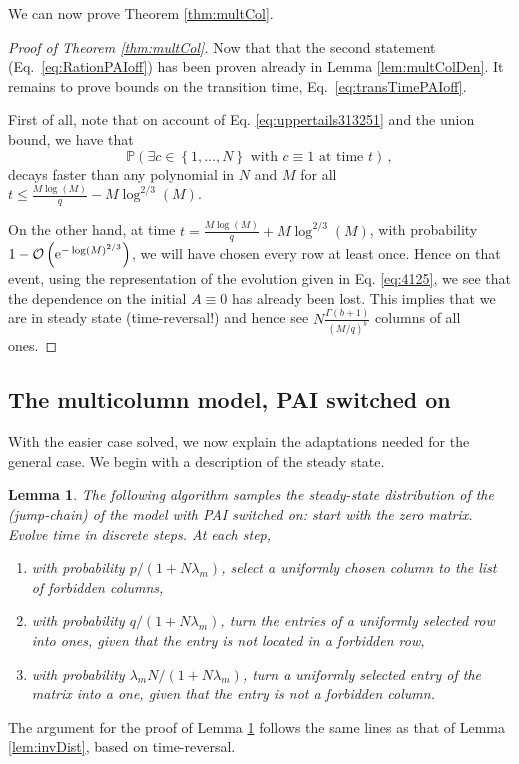 \documentclass{article}
\numberwithin{equation}{section}
\newcommand{\gk}[1]{\left\{#1\right\}}
\newcommand{\rk}[1]{\left(#1\right)}
\newcommand{\Ocal}   {{\mathcal O }}
\renewcommand{\P}   {\mathbb{P}}
\newcommand{\ex}{{\rm e}}
\renewcommand{\l}{\lambda}
\newcommand{\1}{\mathbbm{1}}
\renewcommand{\P}{\mathbb{P}}
\newtheorem{lemma}{Lemma}[section]
\begin{document}
We can now prove Theorem \ref{thm:multCol}.
\begin{proof}[Proof of Theorem \ref{thm:multCol}]
    Now that that the second statement (Eq.~\eqref{eq:RationPAIoff}) has been proven already in Lemma \ref{lem:multColDen}. It remains to prove bounds on the transition time, Eq.~\eqref{eq:transTimePAIoff}.

    First of all, note that on account of Eq. \eqref{eq:uppertails313251} and the union bound, we have that 
    \begin{equation}\label{eq:71520251}
        \P\rk{\exists c\in\gk{1,\ldots, N}\text{ with }c\equiv 1 \text{ at time }t}\, ,
    \end{equation}
    decays faster than any polynomial in $N$ and $M$ for all $t\le \tfrac{M\log(M)}{q}-M\log^{2/3}(M)$. 
    
    On the other hand, at time $t=\tfrac{M\log(M)}{q}+M\log^{2/3}(M)$, with probability $1-\Ocal\rk{\ex^{-\log(M)^{2/3}}}$, we will have chosen every row at least once. Hence on that event, using the representation of the evolution given in Eq. \eqref{eq:4125}, we see that the dependence on the initial $A\equiv 0$ has already been lost. This implies that we are in steady state (time-reversal!) and hence see $N\frac{\Gamma\rk{b+1}}{(M/q)^{b}}$ columns of all ones.
\end{proof}
\subsection{The multicolumn model, PAI switched on}
With the easier case solved, we now explain the adaptations needed for the general case. We begin with a description of the steady state.
\begin{lemma}\label{LemPAIon}
    The following algorithm samples the steady-state distribution of the (jump-chain) of the model with PAI switched on: start with the zero matrix. Evolve time in discrete steps. At each step, 
    \begin{enumerate}
        \item with probability $p/(1+N\l_m)$, select a uniformly chosen column to the list of forbidden columns,
        \item with probability $q/(1+N\l_m)$, turn the entries of a uniformly selected row into ones, given that the entry is not located in a forbidden row,
        \item with probability $\l_m N/(1+N\l_m)$, turn a uniformly selected entry of the matrix into a one, given that the entry is not a forbidden column.
    \end{enumerate}
\end{lemma}
The argument for the proof of Lemma \ref{LemPAIon} follows the same lines as that of Lemma \ref{lem:invDist}, based on time-reversal.
\end{document}
